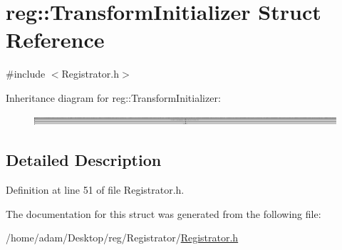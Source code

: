 \hypertarget{structreg_1_1_transform_initializer}{}\section{reg\+:\+:Transform\+Initializer Struct Reference}
\label{structreg_1_1_transform_initializer}


{\ttfamily \#include $<$Registrator.\+h$>$}

Inheritance diagram for reg\+:\+:Transform\+Initializer\+:\begin{figure}[H]
\begin{center}
\leavevmode
\includegraphics[height=0.345306cm]{structreg_1_1_transform_initializer}
\end{center}
\end{figure}


\subsection{Detailed Description}


Definition at line 51 of file Registrator.\+h.



The documentation for this struct was generated from the following file\+:\begin{DoxyCompactItemize}
\item 
/home/adam/\+Desktop/reg/\+Registrator/\hyperlink{_registrator_8h}{Registrator.\+h}\end{DoxyCompactItemize}
